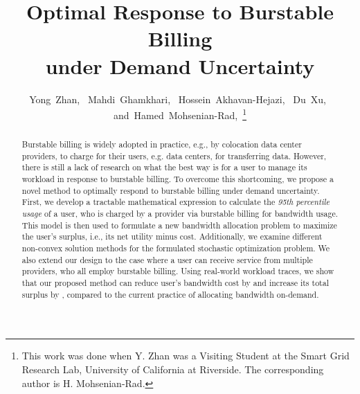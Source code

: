 \documentclass[10pt,journal,compsoc]{IEEEtran}
\begin{document}
\title{Optimal Response to Burstable Billing \\ under Demand Uncertainty}


\author{Yong~Zhan,~
        Mahdi~Ghamkhari,~
        Hossein~Akhavan-Hejazi,~
        Du~Xu,~
        and~Hamed~Mohsenian-Rad,~\thanks{This work was done when Y. Zhan was a Visiting Student at the Smart Grid Research Lab, University of California at Riverside. The corresponding author is H. Mohsenian-Rad.}}





















\maketitle
\begin{abstract}
Burstable billing is widely adopted in practice, e.g., by colocation data center providers, to charge for their users, e.g. data centers, for  transferring data. However, there is still a lack of research on what the best way is for a user to manage its workload in response to burstable billing. To overcome this shortcoming, we propose a novel method to optimally respond to burstable billing under demand uncertainty. First, we develop a tractable mathematical expression to calculate the \emph{95th percentile usage} of a user, who is charged by a provider via burstable billing for bandwidth usage. This model is then used to formulate a new bandwidth allocation problem to maximize the user's surplus, i.e., its net utility minus cost.
Additionally, we  examine different non-convex solution methods for the formulated stochastic optimization problem.
 We also extend our design to the case where a user can receive service from multiple providers, who all employ burstable billing. Using real-world workload traces, we show that our proposed method can reduce user's bandwidth cost by  and increase its total surplus by ,  compared to the current practice of allocating bandwidth on-demand.
\end{abstract}
\end{document}
